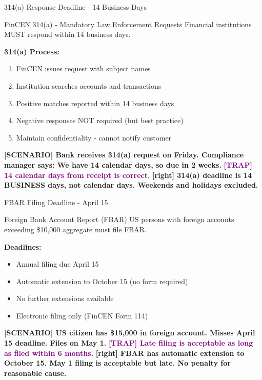 \documentclass[11pt,a4paper]{beamer}
\newcommand{\trap}[1]{\textcolor{purple}{\textbf{[TRAP] #1}}}
\newcommand{\correct}[1]{\textcolor{green!50!black}{\textbf{[right] #1}}}
\newcommand{\scenario}[1]{\textcolor{blue!70!black}{\textbf{[SCENARIO] #1}}}
\begin{document}
\begin{frame}{314(a) Response Deadline - 14 Business Days}
\begin{block}{FinCEN 314(a) - Mandatory Law Enforcement Requests}
Financial institutions MUST respond within 14 business days.
\end{block}
\textbf{314(a) Process:}
\begin{enumerate}
\item FinCEN issues request with subject names
\item Institution searches accounts and transactions
\item Positive matches reported within 14 business days
\item Negative responses NOT required (but best practice)
\item Maintain confidentiality - cannot notify customer
\end{enumerate}
\scenario{Bank receives 314(a) request on Friday. Compliance manager says: We have 14 calendar days, so due in 2 weeks.}
\trap{14 calendar days from receipt is correct.}
\correct{314(a) deadline is 14 BUSINESS days, not calendar days. Weekends and holidays excluded.}
\end{frame}

\begin{frame}{FBAR Filing Deadline - April 15}
\begin{block}{Foreign Bank Account Report (FBAR)}
US persons with foreign accounts exceeding \$10,000 aggregate must file FBAR.
\end{block}
\textbf{Deadlines:}
\begin{itemize}
\item Annual filing due April 15
\item Automatic extension to October 15 (no form required)
\item No further extensions available
\item Electronic filing only (FinCEN Form 114)
\end{itemize}
\scenario{US citizen has \$15,000 in foreign account. Misses April 15 deadline. Files on May 1.}
\trap{Late filing is acceptable as long as filed within 6 months.}
\correct{FBAR has automatic extension to October 15. May 1 filing is acceptable but late. No penalty for reasonable cause.}
\end{frame}

\end{document}
